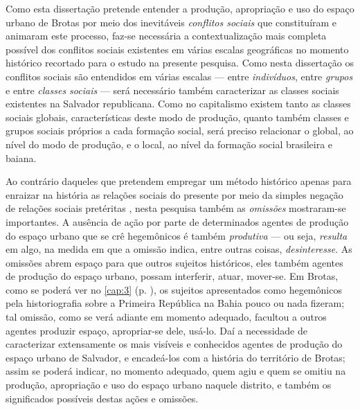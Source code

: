 Como esta dissertação pretende entender a produção, apropriação e uso do espaço urbano de Brotas por meio dos inevitáveis \textit{conflitos sociais} que constituíram e animaram este processo, faz-se necessária a contextualização mais completa possível dos conflitos sociais existentes em várias escalas geográficas no momento histórico recortado para o estudo na presente pesquisa. Como nesta dissertação os conflitos sociais são entendidos em várias escalas --- entre \textit{indivíduos}, entre \textit{grupos} e entre \textit{classes sociais} --- será necessário também caracterizar as classes sociais existentes na Salvador republicana. Como no capitalismo existem tanto as classes sociais globais, características deste modo de produção, quanto também classes e grupos sociais próprios a cada formação social, será preciso relacionar o global, ao nível do modo de produção, e o local, ao nível da formação social brasileira e baiana.

Ao contrário daqueles que pretendem empregar um método histórico apenas para enraizar na história as relações sociais do presente por meio da simples negação de relações sociais pretéritas \cite{machado_harxhist_2018}, nesta pesquisa também as \textit{omissões} mostraram-se importantes. A ausência de ação por parte de determinados agentes de produção do espaço urbano que se crê hegemônicos é também \textit{produtiva} --- ou seja, \textit{resulta} em algo, na medida em que a omissão indica, entre outras coisas, \textit{desinteresse}. As omissões abrem espaço para que outros sujeitos históricos, eles também agentes de produção do espaço urbano, possam interferir, atuar, mover-se. Em Brotas, como se poderá ver no \autoref{cap:3} (p. \pageref{cap:3}), os sujeitos apresentados como hegemônicos pela historiografia sobre a Primeira República na Bahia pouco ou nada fizeram; tal omissão, como se verá adiante em momento adequado, facultou a outros agentes produzir espaço, apropriar-se dele, usá-lo. Daí a necessidade de caracterizar extensamente os mais visíveis e conhecidos agentes de produção do espaço urbano de Salvador, e encadeá-los com a história do território de Brotas; assim se poderá indicar, no momento adequado, quem agiu e quem se omitiu na produção, apropriação e uso do espaço urbano naquele distrito, e também os significados possíveis destas ações e omissões.






% 